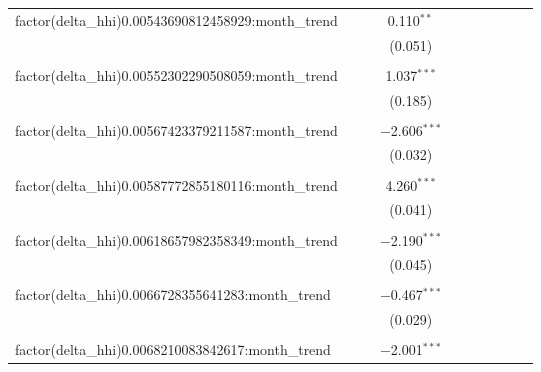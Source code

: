 \begin{table}[H]
{\begin{tabular}{@{\extracolsep{5pt}}lccccccccc}
  factor(delta\_hhi)0.00543690812458929:month\_trend &  &  & 0.110$^{**}$ &  &  &  &  &  &  \\  

   &  &  & (0.051) &  &  &  &  &  &  \\  

   & & & & & & & & & \\  

  factor(delta\_hhi)0.00552302290508059:month\_trend &  &  & 1.037$^{***}$ &  &  &  &  &  &  \\  

   &  &  & (0.185) &  &  &  &  &  &  \\  

   & & & & & & & & & \\  

  factor(delta\_hhi)0.00567423379211587:month\_trend &  &  & $-$2.606$^{***}$ &  &  &  &  &  &  \\  

   &  &  & (0.032) &  &  &  &  &  &  \\  

   & & & & & & & & & \\  

  factor(delta\_hhi)0.00587772855180116:month\_trend &  &  & 4.260$^{***}$ &  &  &  &  &  &  \\  

   &  &  & (0.041) &  &  &  &  &  &  \\  

   & & & & & & & & & \\  

  factor(delta\_hhi)0.00618657982358349:month\_trend &  &  & $-$2.190$^{***}$ &  &  &  &  &  &  \\  

   &  &  & (0.045) &  &  &  &  &  &  \\  

   & & & & & & & & & \\  

  factor(delta\_hhi)0.0066728355641283:month\_trend &  &  & $-$0.467$^{***}$ &  &  &  &  &  &  \\  

   &  &  & (0.029) &  &  &  &  &  &  \\  

   & & & & & & & & & \\  

  factor(delta\_hhi)0.0068210083842617:month\_trend &  &  & $-$2.001$^{***}$ &  &  &  &  &  &  \\  


\end{tabular}}
\end{table}

